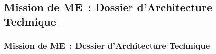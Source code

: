 \subsection{Mission de ME~: Dossier d'Architecture Technique}
\begin{frame}
	\frametitle{Mission de ME~: Dossier d'Architecture Technique}
\end{frame}


